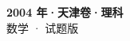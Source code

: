 \documentclass[zihao=-4, a4paper]{ctexart}
\begin{document}
\begin{center}
  {\Large\bfseries 2004 年·天津卷·理科}\\[4pt]
  {\large 数学 · 试题版}
\end{center}
\medskip
{}

\end{document}
